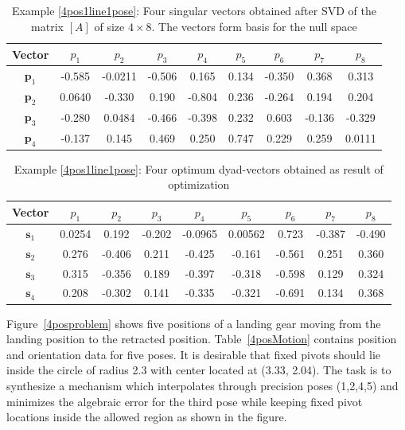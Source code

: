 \begin{table}[thb]
  \caption{Example \ref{4pos1line1pose}: Four singular vectors obtained after SVD of the matrix $[A]$ of size $4\times8$. The vectors form basis for the null space}
  \centering
  \begin{tabular}{ccccccccc}
  \hline
  Vector &$p_1$&$p_2$&$p_3$&$p_4$&$p_5$&$p_6$&$p_7$&$p_8$\\
    \hline
   $\textbf{p}_1$& -0.585 & -0.0211 & -0.506 & 0.165 & 0.134 & -0.350 & 0.368 & 0.313 \\
   $\textbf{p}_2$& 0.0640 & -0.330 & 0.190 & -0.804 & 0.236 & -0.264 & 0.194 & 0.204 \\
   $\textbf{p}_3$& -0.280 & 0.0484 & -0.466 & -0.398 & 0.232 & 0.603 & -0.136 & -0.329 \\
   $\textbf{p}_4$& -0.137 & 0.145 & 0.469 & 0.250 & 0.747 & 0.229 & 0.259 & 0.0111 \\
    \hline
  \end{tabular}
  \label{svectors4pos}
\end{table}

\begin{table}[thb]
 \caption{Example \ref{4pos1line1pose}: Four optimum dyad-vectors obtained as result of optimization}
  \centering
  \begin{tabular}{ccccccccc}
  \hline
  Vector &$p_1$&$p_2$&$p_3$&$p_4$&$p_5$&$p_6$&$p_7$&$p_8$\\
    \hline
$\textbf{s}_1$&  0.0254 & 0.192 & -0.202 & -0.0965 & 0.00562 & 0.723 & -0.387 & -0.490 \\
$\textbf{s}_2$& 0.276 & -0.406 & 0.211 & -0.425 & -0.161 & -0.561 & 0.251 & 0.360 \\
$\textbf{s}_3$& 0.315 & -0.356 & 0.189 & -0.397 & -0.318 & -0.598 & 0.129 & 0.324 \\
$\textbf{s}_4$& 0.208 & -0.302 & 0.141 & -0.335 & -0.321 & -0.691 & 0.134 & 0.368 \\
    \hline
  \end{tabular}
  \label{dyadvectors4pos}
\end{table}

Figure~\ref{4posproblem} shows five positions of a landing gear moving from the landing position to the retracted position. Table~\ref{4posMotion} contains position and orientation data for five poses. It is desirable that fixed pivots should lie inside the circle of radius 2.3 with center located at (3.33, 2.04). The task is to synthesize a mechanism which interpolates through precision poses (1,2,4,5) and minimizes the algebraic error for the third pose while keeping fixed pivot locations inside the allowed region as shown in the figure.


